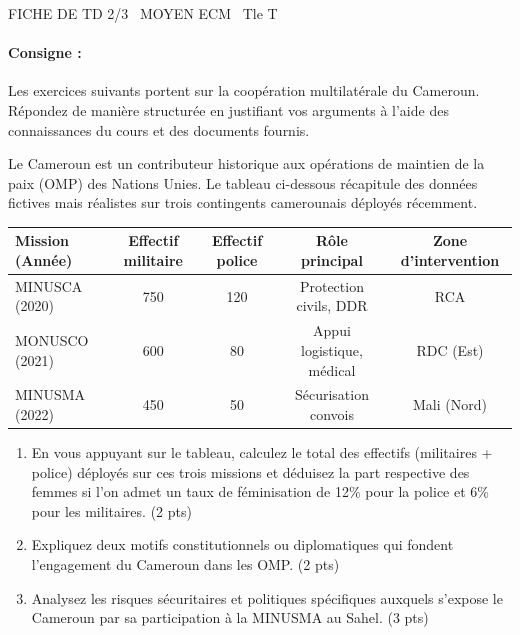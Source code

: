 \documentclass[11pt]{article}
\begin{document}
\begin{tcolorbox}[enhanced,colback=popink,colframe=popink,arc=10pt,boxrule=0pt,left=12pt,right=12pt,top=9pt,bottom=9pt]
{\color{white}\popxbold\small FICHE DE TD 2/3 \textbullet\ MOYEN \hfill ECM \textbullet\ Tle T\par}
\end{tcolorbox}
\vspace{4pt}
\paragraph{Consigne :} Les exercices suivants portent sur la coopération multilatérale du Cameroun. Répondez de manière structurée en justifiant vos arguments à l'aide des connaissances du cours et des documents fournis.

\begin{exercice}
Le Cameroun est un contributeur historique aux opérations de maintien de la paix (OMP) des Nations Unies. Le tableau ci-dessous récapitule des données fictives mais réalistes sur trois contingents camerounais déployés récemment.

\begin{center}
\begin{tabular}{|l|c|c|c|c|}
\hline
\textbf{Mission (Année)} & \textbf{Effectif militaire} & \textbf{Effectif police} & \textbf{Rôle principal} & \textbf{Zone d'intervention} \\
\hline
MINUSCA (2020) & 750 & 120 & Protection civils, DDR & RCA \\
\hline
MONUSCO (2021) & 600 & 80 & Appui logistique, médical & RDC (Est) \\
\hline
MINUSMA (2022) & 450 & 50 & Sécurisation convois & Mali (Nord) \\
\hline
\end{tabular}
\end{center}

\begin{enumerate}
\item En vous appuyant sur le tableau, calculez le total des effectifs (militaires + police) déployés sur ces trois missions et déduisez la part respective des femmes si l'on admet un taux de féminisation de 12\% pour la police et 6\% pour les militaires. (2 pts)
\item Expliquez deux motifs constitutionnels ou diplomatiques qui fondent l'engagement du Cameroun dans les OMP. (2 pts)
\item Analysez les risques sécuritaires et politiques spécifiques auxquels s'expose le Cameroun par sa participation à la MINUSMA au Sahel. (3 pts)
\end{enumerate}
\end{exercice}
\end{document}
